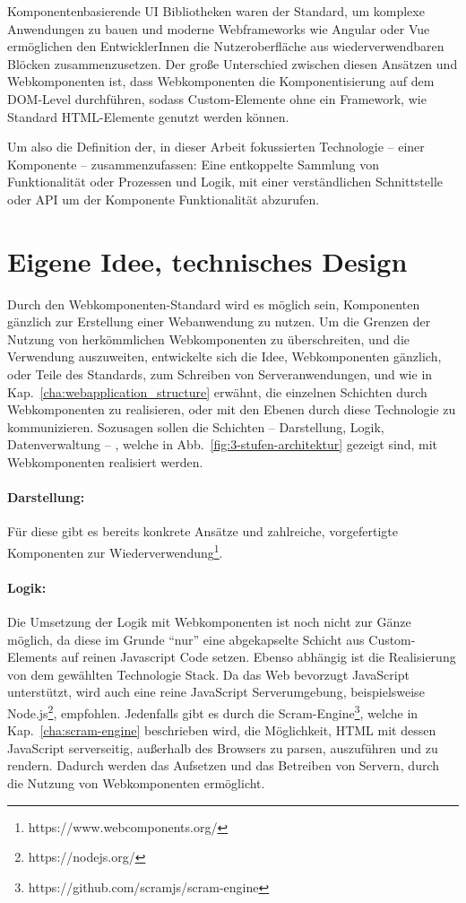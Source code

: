 Komponentenbasierende UI Bibliotheken waren der Standard, um komplexe Anwendungen zu bauen und moderne Webframeworks wie Angular oder Vue ermöglichen den EntwicklerInnen die Nutzeroberfläche aus wiederverwendbaren Blöcken zusammenzusetzen. Der große Unterschied zwischen diesen Ansätzen und Webkomponenten ist, dass Webkomponenten die Komponentisierung auf dem DOM-Level durchführen, sodass Custom-Elemente ohne ein Framework, wie Standard HTML-Elemente genutzt werden können. 

Um also die Definition der, in dieser Arbeit fokussierten Technologie -- einer Komponente -- zusammenzufassen: Eine entkoppelte Sammlung von Funktionalität oder Prozessen und Logik, mit einer verständlichen Schnittstelle oder API um der Komponente Funktionalität abzurufen.


\section{Eigene Idee, technisches Design}
Durch den Webkomponenten-Standard wird es möglich sein, Komponenten gänzlich zur Erstellung einer Webanwendung zu nutzen. Um die Grenzen der Nutzung von herkömmlichen Webkomponenten zu überschreiten, und die Verwendung auszuweiten, entwickelte sich die Idee, Webkomponenten gänzlich, oder Teile des Standards, zum Schreiben von Serveranwendungen, und wie in Kap.~\ref{cha:webapplication_structure} erwähnt, die einzelnen Schichten durch Webkomponenten zu realisieren, oder mit den Ebenen durch diese Technologie zu kommunizieren. Sozusagen sollen die Schichten -- Darstellung, Logik, Datenverwaltung -- , welche in Abb.~\ref{fig:3-stufen-architektur} gezeigt sind, mit Webkomponenten realisiert werden. 

\paragraph{Darstellung:}Für diese gibt es bereits konkrete Ansätze und zahlreiche, vorgefertigte Komponenten zur Wiederverwendung\footnote{https://www.webcomponents.org/}.

\paragraph{Logik: }Die Umsetzung der Logik mit Webkomponenten ist noch nicht zur Gänze möglich, da diese im Grunde "`nur"' eine abgekapselte Schicht aus Custom-Elements auf reinen Javascript Code setzen. Ebenso abhängig ist die Realisierung von dem gewählten Technologie Stack. Da das Web bevorzugt JavaScript unterstützt, wird auch eine reine JavaScript Serverumgebung, beispielsweise Node.js\footnote{https://nodejs.org/}, empfohlen. Jedenfalls gibt es durch die Scram-Engine\footnote{https://github.com/scramjs/scram-engine}, welche in Kap.~\ref{cha:scram-engine} beschrieben wird, die Möglichkeit, HTML mit dessen JavaScript serverseitig, außerhalb des Browsers zu parsen, auszuführen und zu rendern. Dadurch werden das Aufsetzen und das Betreiben von Servern, durch die Nutzung von Webkomponenten ermöglicht.

